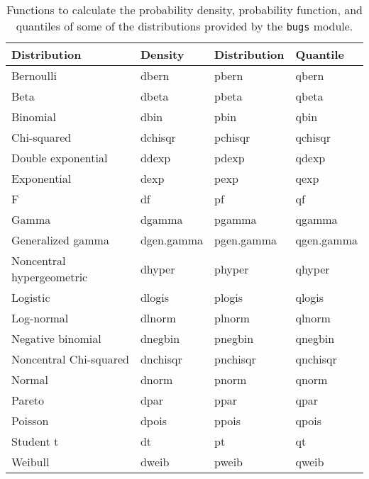 \documentclass[11pt, a4paper, titlepage]{report}
\begin{document}
\begin{table}
\begin{center}
\begin{tabular}{llll}
\hline
Distribution & Density & Distribution & Quantile \\
\hline
Bernoulli          & dbern     & pbern     & qbern \\
Beta               & dbeta     & pbeta     & qbeta \\
Binomial           & dbin      & pbin      & qbin \\
Chi-squared        & dchisqr   & pchisqr   & qchisqr \\
Double exponential & ddexp     & pdexp     & qdexp \\
Exponential        & dexp      & pexp      & qexp \\
F                  & df        & pf        & qf \\
Gamma              & dgamma    & pgamma    & qgamma \\
Generalized gamma  & dgen.gamma & pgen.gamma & qgen.gamma \\
Noncentral hypergeometric     & dhyper    & phyper    & qhyper \\
Logistic           & dlogis    & plogis    & qlogis \\
Log-normal         & dlnorm    & plnorm    & qlnorm \\
Negative binomial  & dnegbin   & pnegbin   & qnegbin \\
Noncentral Chi-squared & dnchisqr   & pnchisqr   & qnchisqr \\
Normal             & dnorm     & pnorm     & qnorm \\
Pareto             & dpar      & ppar      & qpar \\
Poisson            & dpois     & ppois     & qpois \\
Student t          & dt        & pt        & qt \\
Weibull            & dweib     & pweib     & qweib \\
\hline
\end{tabular}
\caption{Functions to calculate the probability density, probability
  function, and quantiles of some of the distributions provided by the
  \texttt{bugs} module. \label{table:bugs:dpq}}
\end{center}
\end{table}
\end{document}
